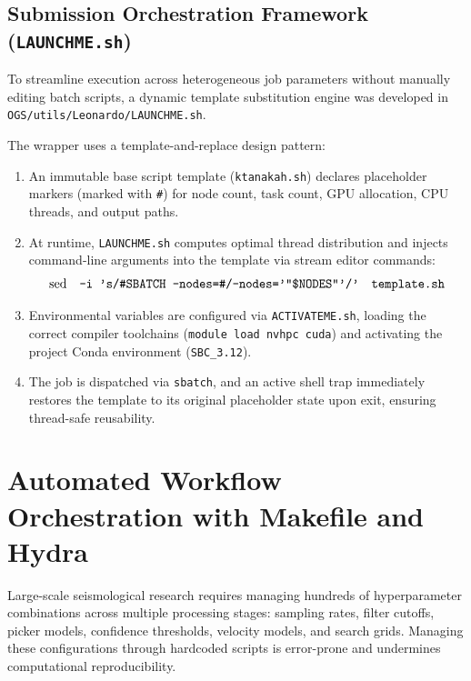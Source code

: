 \subsection{Submission Orchestration Framework (\texttt{LAUNCHME.sh})}
To streamline execution across heterogeneous job parameters without manually editing batch scripts, a dynamic template substitution engine was developed in \texttt{OGS/utils/Leonardo/LAUNCHME.sh}.

The wrapper uses a template-and-replace design pattern:
\begin{enumerate}
  \item An immutable base script template (\texttt{ktanakah.sh}) declares placeholder markers (marked with \texttt{\#}) for node count, task count, GPU allocation, CPU threads, and output paths.
  \item At runtime, \texttt{LAUNCHME.sh} computes optimal thread distribution and injects command-line arguments into the template via stream editor commands:
  \begin{equation}
    \mathrm{sed} \quad \text{\texttt{-i 's/\#SBATCH --nodes=\#/--nodes='"\$NODES"'/'}} \quad \text{\texttt{template.sh}}
  \end{equation}
  \item Environmental variables are configured via \texttt{ACTIVATEME.sh}, loading the correct compiler toolchains (\texttt{module load nvhpc cuda}) and activating the project Conda environment (\texttt{SBC\_3.12}).
  \item The job is dispatched via \texttt{sbatch}, and an active shell trap immediately restores the template to its original placeholder state upon exit, ensuring thread-safe reusability.
\end{enumerate}

\section{Automated Workflow Orchestration with Makefile and Hydra}
\label{sec:orchestration}

Large-scale seismological research requires managing hundreds of hyperparameter combinations across multiple processing stages: sampling rates, filter cutoffs, picker models, confidence thresholds, velocity models, and search grids. Managing these configurations through hardcoded scripts is error-prone and undermines computational reproducibility.

